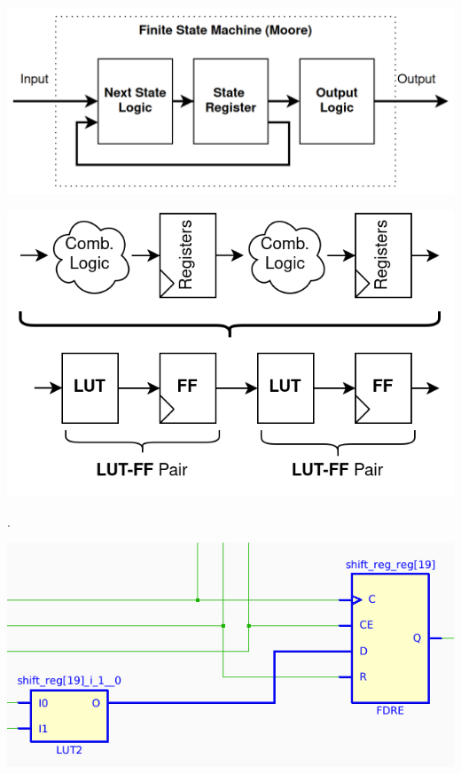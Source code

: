 \begin{multicols}{2}
\vspace{1.0cm}
{
    \centering
    \includegraphics[width=\columnwidth]{figures/fsm.png}
    \label{fig:fsm}
}
\vspace{1.0cm}

{
    \centering
    \includegraphics[width=0.9\columnwidth]{figures/pipelining.png}
    \label{fig:pipelining}
}

\vfill
.
\newcolumn

{
    \centering
    \includegraphics[width=0.9\columnwidth]{figures/lut_ff_pair.png}
    \label{fig:lut_ff_pair}
}
\vspace{1.0cm}


\end{multicols}
